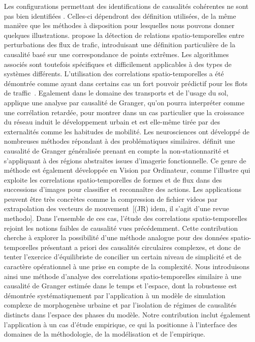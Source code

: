 {Les configurations permettant des identifications de causalités cohérentes ne sont pas bien identifiées . Celles-ci dépendront des définition  utilisées, de la même manière que les méthodes à disposition pour lesquelles nous pouvons donner quelques illustrations. \cite{liu2011discovering} propose la détection de relations spatio-temporelles entre perturbations des flux de trafic, introduisant une définition particulière de la causalité basé sur une correspondance de points extrêmes. Les algorithmes associés sont toutefois spécifiques et difficilement applicables à des types de systèmes différents. L'utilisation des correlations  spatio-temporelles a été démontrée comme ayant dans certains cas un fort pouvoir prédictif pour les flots de traffic~\cite{min2011real}. Egalement dans le domaine des transports et de l'usage du sol, \cite{xie2009streetcars} applique une analyse par causalité de Granger, qu'on pourra interpréter comme une corrélation retardée, pour montrer dans un cas particulier que la croissance du réseau induit le développement urbain et est elle-même tirée par des externalités comme les habitudes de mobilité. Les neurosciences ont développé de nombreuses méthodes répondant à des problématiques similaires. \cite{luo2013spatio} définit une causalité de Granger généralisée prenant en compte la non-stationnarité et s'appliquant à des régions abstraites issues d'imagerie fonctionnelle. Ce genre de méthode est également développée en Vision par Ordinateur, comme l'illustre \cite{ke2007spatio} qui exploite les correlations  spatio-temporelles de formes et de flux dans des successions d'images pour classifier et reconnaître des actions. Les applications peuvent être très concrètes comme la compression de fichier videos par extrapolation des vecteurs de mouvement~\cite{chalidabhongse1997fast}[(JR) idem, il s'agit d'une revue methodo]. Dans l'ensemble de ces cas, l'étude des correlations spatio-temporelles rejoint les notions faibles de causalité vues précédemment. Cette contribution cherche à explorer la possibilité d'une méthode analogue pour des données spatio-temporelles présentant a priori des causalités circulaires complexes, et donc de tenter l'exercice d'équilibriste de concilier un certain niveau de simplicité et de caractère opérationnel à une prise en compte de la complexité. Nous introduisons ainsi une méthode d'analyse des correlations  spatio-temporelles similaire à une causalité de Granger estimée dans le temps et l'espace, dont la robustesse est démontrée systématiquement par l'application à un modèle de simulation complexe de morphogenèse urbaine et par l'isolation de régimes de causalités distincts dans l'espace des phases du modèle. Notre contribution inclut également l'application à un cas d'étude empirique, ce qui la positionne à l'interface des domaines de la méthodologie, de la modélisation et de l'empirique.
}


